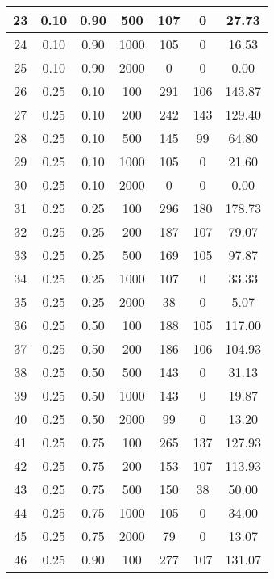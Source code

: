 \documentclass[a4paper, 12pt, unknownkeysallowed]{extreport}
\begin{document}
\begin{center}
\begin{longtable}[c]{|c|c|c|c|c|c|c|}
 23 & 0.10 & 0.90 &   500 &  107 &    0 & 27.73 \\ \hline
 24 & 0.10 & 0.90 &  1000 &  105 &    0 & 16.53 \\ \hline
 25 & 0.10 & 0.90 &  2000 &    0 &    0 &  0.00 \\ \hline
 26 & 0.25 & 0.10 &   100 &  291 &  106 & 143.87 \\ \hline
 27 & 0.25 & 0.10 &   200 &  242 &  143 & 129.40 \\ \hline
 28 & 0.25 & 0.10 &   500 &  145 &   99 & 64.80 \\ \hline
 29 & 0.25 & 0.10 &  1000 &  105 &    0 & 21.60 \\ \hline
 30 & 0.25 & 0.10 &  2000 &    0 &    0 &  0.00 \\ \hline
 31 & 0.25 & 0.25 &   100 &  296 &  180 & 178.73 \\ \hline
 32 & 0.25 & 0.25 &   200 &  187 &  107 & 79.07 \\ \hline
 33 & 0.25 & 0.25 &   500 &  169 &  105 & 97.87 \\ \hline
 34 & 0.25 & 0.25 &  1000 &  107 &    0 & 33.33 \\ \hline
 35 & 0.25 & 0.25 &  2000 &   38 &    0 &  5.07 \\ \hline
 36 & 0.25 & 0.50 &   100 &  188 &  105 & 117.00 \\ \hline
 37 & 0.25 & 0.50 &   200 &  186 &  106 & 104.93 \\ \hline
 38 & 0.25 & 0.50 &   500 &  143 &    0 & 31.13 \\ \hline
 39 & 0.25 & 0.50 &  1000 &  143 &    0 & 19.87 \\ \hline
 40 & 0.25 & 0.50 &  2000 &   99 &    0 & 13.20 \\ \hline
 41 & 0.25 & 0.75 &   100 &  265 &  137 & 127.93 \\ \hline
 42 & 0.25 & 0.75 &   200 &  153 &  107 & 113.93 \\ \hline
 43 & 0.25 & 0.75 &   500 &  150 &   38 & 50.00 \\ \hline
 44 & 0.25 & 0.75 &  1000 &  105 &    0 & 34.00 \\ \hline
 45 & 0.25 & 0.75 &  2000 &   79 &    0 & 13.07 \\ \hline
 46 & 0.25 & 0.90 &   100 &  277 &  107 & 131.07 \\ \hline
  \end{longtable}
\end{center}
\end{document}
